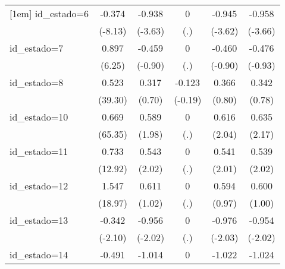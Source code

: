 {\begin{tabular}{l*{5}{c}}
[1em]
id\_estado=6         &      -0.374\sym{***}&      -0.938\sym{***}&           0         &      -0.945\sym{***}&      -0.958\sym{***}\\
                    &     (-8.13)         &     (-3.63)         &         (.)         &     (-3.62)         &     (-3.66)         \\
[1em]
id\_estado=7         &       0.897\sym{***}&      -0.459         &           0         &      -0.460         &      -0.476         \\
                    &      (6.25)         &     (-0.90)         &         (.)         &     (-0.90)         &     (-0.93)         \\
[1em]
id\_estado=8         &       0.523\sym{***}&       0.317         &      -0.123         &       0.366         &       0.342         \\
                    &     (39.30)         &      (0.70)         &     (-0.19)         &      (0.80)         &      (0.78)         \\
[1em]
id\_estado=10        &       0.669\sym{***}&       0.589\sym{*}  &           0         &       0.616\sym{*}  &       0.635\sym{*}  \\
                    &     (65.35)         &      (1.98)         &         (.)         &      (2.04)         &      (2.17)         \\
[1em]
id\_estado=11        &       0.733\sym{***}&       0.543\sym{*}  &           0         &       0.541\sym{*}  &       0.539\sym{*}  \\
                    &     (12.92)         &      (2.02)         &         (.)         &      (2.01)         &      (2.02)         \\
[1em]
id\_estado=12        &       1.547\sym{***}&       0.611         &           0         &       0.594         &       0.600         \\
                    &     (18.97)         &      (1.02)         &         (.)         &      (0.97)         &      (1.00)         \\
[1em]
id\_estado=13        &      -0.342\sym{*}  &      -0.956\sym{*}  &           0         &      -0.976\sym{*}  &      -0.954\sym{*}  \\
                    &     (-2.10)         &     (-2.02)         &         (.)         &     (-2.03)         &     (-2.02)         \\
[1em]
id\_estado=14        &      -0.491\sym{***}&      -1.014\sym{***}&           0         &      -1.022\sym{***}&      -1.024\sym{***}\\

\end{tabular}}
